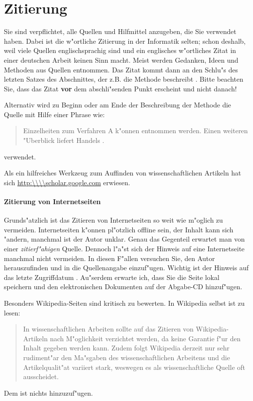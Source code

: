 \documentclass[12pt,a4paper,headinclude,twoside, plainheadsepline, open=right,numbers=noenddot]{scrreprt}
\begin{document}
\section{Zitierung}\label{zitierung}

Sie sind verpflichtet, alle Quellen und Hilfmittel anzugeben, die Sie verwendet haben.
Dabei ist die w"ortliche Zitierung in der Informatik selten; schon deshalb, weil viele Quellen englischsprachig sind und ein englisches w"ortliches Zitat in einer deutschen Arbeit keinen Sinn macht.
Meist werden Gedanken, Ideen und Methoden aus Quellen entnommen.
Das Zitat kommt dann an den Schlu"s des letzten Satzes des Abschnittes, der z.B. die Methode beschreibt \cite{szalo2015graphmic}.
Bitte beachten Sie, dass das Zitat \textbf{vor} dem abschli"senden Punkt erscheint und nicht danach!

Alternativ wird zu Beginn oder am Ende der Beschreibung der Methode die Quelle mit Hilfe einer Phrase wie:
\begin{quote}
Einzelheiten zum Verfahren A k"onnen \cite{palm2004color} entnommen werden.
Einen weiteren "Uberblick liefert Handels \cite{handels2000medizinische}.
\end{quote}
verwendet.

Als ein hilfreiches Werkzeug zum Auffinden von wissenschaftlichen Artikeln hat sich \url{http:\\\\scholar.google.com} erwiesen.

\paragraph{Zitierung von Internetseiten}
Grunds"atzlich ist das Zitieren von Internetseiten so weit wie m"oglich zu vermeiden.
Internetseiten k"onnen pl"otzlich offline sein, der Inhalt kann sich "andern, manchmal ist der Autor unklar.
Genau das Gegenteil erwartet man von einer \emph{zitierf"ahigen} Quelle.
Dennoch l"a"st sich der Hinweis auf eine Internetseite manchmal nicht vermeiden.
In diesen F"allen versuchen Sie, den Autor herauszufinden und in die Quellenangabe einzuf"ugen.
Wichtig ist der Hinweis auf das letzte Zugriffdatum \cite{zitieren13}.
Au"serdem erwarte ich, dass Sie die Seite lokal speichern und den elektronischen Dokumenten auf der Abgabe-CD hinzuf"ugen.

Besonders Wikipedia-Seiten sind kritisch zu bewerten. In Wikipedia selbst ist zu lesen:
\begin{quote}
\glqq In wissenschaftlichen Arbeiten sollte auf das Zitieren von Wikipedia-Artikeln nach M"oglichkeit verzichtet werden, da keine Garantie f"ur den Inhalt gegeben werden kann.
Zudem folgt Wikipedia derzeit nur sehr rudiment"ar den Ma"sgaben des wissenschaftlichen Arbeitens und die Artikelqualit"at variiert stark, weswegen es als wissenschaftliche Quelle oft ausscheidet.\grqq \cite{zitieren13a}
\end{quote}
Dem ist nichts hinzuzuf"ugen.
\end{document}
